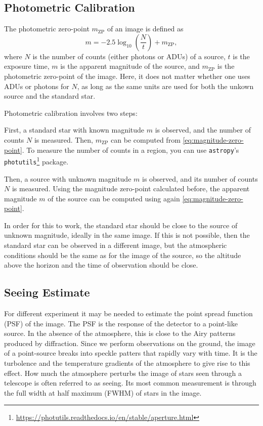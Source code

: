 \documentclass[a4paper, 11pt, fleqn]{memoir}
\begin{document}
\subsection{Photometric Calibration}

The photometric zero-point $m_\text{ZP}$ of an image is defined as
\begin{equation}
    \label{eq:magnitude-zero-point}
    m = -2.5 \log_{10} \left( \frac{N}{t} \right) + m_\text{ZP},
\end{equation}
where $N$ is the number of counts (either photons or ADUs) of a source, $t$ is the exposure time, $m$ is the apparent magnitude of the source, and $m_\text{ZP}$ is the photometric zero-point of the image.
Here, it does not matter whether one uses ADUs or photons for $N$, as long as the same units are used for both the unkown source and the standard star.



Photometric calibration involves two steps:

First, a standard star with known magnitude $m$ is observed, and the number of counts $N$ is measured. Then, $m_\text{ZP}$ can be computed from \cref{eq:magnitude-zero-point}.
To measure the number of counts in a region, you can use \texttt{astropy}'s \texttt{photutils}\footnote{\url{https://photutils.readthedocs.io/en/stable/aperture.html}} package.

Then, a source with unknown magnitude $m$ is observed, and its number of counts $N$ is measured. Using the magnitude zero-point calculated before, the apparent magnitude $m$ of the source can be computed using again \cref{eq:magnitude-zero-point}.

In order for this to work, the standard star should be close to the source of unknown magnitude, ideally in the same image.
If this is not possible, then the standard star can be observed in a different image, but the atmospheric conditions should be the same as for the image of the source, so the altitude above the horizon and the time of observation should be close.



\subsection{Seeing Estimate}

For different experiment it may be needed to estimate the point spread function (PSF) of the image.
The PSF is the response of the detector to a point-like source.
In the absence of the atmosphere, this is close to the Airy patterns produced by diffraction.
Since we perform observations on the ground, the image of a point-source breaks into speckle patters that rapidly vary with time.
It is the turbolence and the temperature gradients of the atmosphere to give rise to this effect.
How much the atmosphere perturbs the image of stars seen through a telescope is often referred to as seeing.
Its most common measurement is through the full width at half maximum (FWHM) of stars in the image.
\end{document}
